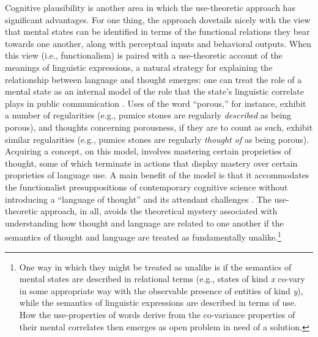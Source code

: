 Cognitive plausibility is another area in which the use-theoretic approach has significant advantages. For one thing, the approach dovetails nicely with the view that mental states can be identified in terms of the functional relations they bear towards one another, along with perceptual inputs and behavioral outputs. When this view (i.e., functionalism) is paired with a use-theoretic account of the meanings of linguistic expressions, a natural strategy for explaining the relationship between language and thought emerges: one can treat the role of a mental state as an internal model of the role that the state's linguistic correlate plays in public communication \citep{Block:1986}. Uses of the word ``porous,'' for instance, exhibit a number of regularities (e.g., pumice stones are regularly \textit{described} as being porous), and thoughts concerning porousness, if they are to count as such, exhibit similar regularities (e.g., pumice stones are regularly \textit{thought of} as being porous). Acquiring a concept, on this model, involves mastering certain proprieties of thought, some of which terminate in actions that display mastery over certain proprieties of language use. A main benefit of the model is that it accommodates the functionalist presuppositions of contemporary cognitive science \citep{Fodor:1998} without introducing a ``language of thought'' and its attendant challenges \citep[see e.g.,][]{Dennett:1987}. The use-theoretic approach, in all, avoids the theoretical mystery associated with understanding how thought and language are related to one another if the semantics of thought and language are treated as fundamentally unalike.\footnote{One way in which they might be treated as unalike is if the semantics of mental states are described in relational terms (e.g., states of kind \textit{x} co-vary in some appropriate way with the observable presence of entities of kind \textit{y}), while the semantics of linguistic expressions are described in terms of use. How the use-properties of words derive from the co-variance properties of their mental correlates then emerges as open problem in need of a solution.}

